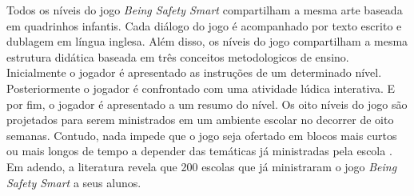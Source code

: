 
Todos os níveis do jogo \textit{Being Safety Smart} compartilham a mesma arte baseada em quadrinhos infantis. Cada diálogo do jogo é acompanhado por texto escrito e dublagem em língua inglesa. Além disso, os níveis do jogo compartilham a mesma estrutura didática baseada em três conceitos metodologicos de ensino. Inicialmente o jogador é apresentado as instruções de um determinado nível. Posteriormente o jogador é confrontado com uma atividade lúdica interativa. E por fim, o jogador é apresentado a um resumo do nível. Os oito níveis do jogo são projetados para serem ministrados em um ambiente escolar no decorrer de oito semanas. Contudo, nada impede que o jogo seja ofertado em blocos mais curtos ou mais longos de tempo a depender das temáticas já ministradas pela escola \citeyear{jones2010being}. Em adendo, a literatura revela que 200 escolas que já ministraram o jogo \textit{Being Safety Smart} a seus alunos.








